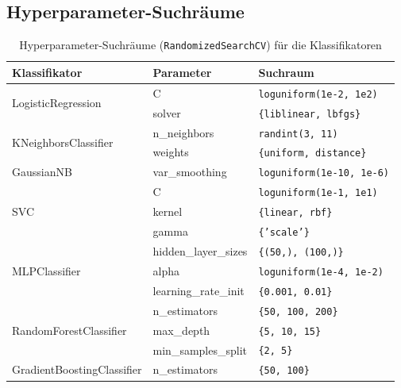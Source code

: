 \documentclass[10pt]{scrartcl}
\begin{document}
\subsection{Hyperparameter-Suchräume}
\begin{table}[htbp]
    \centering
    \caption{Hyperparameter-Suchräume (\texttt{RandomizedSearchCV}) für die Klassifikatoren}
    \label{tab:hyperparameters}
    \begin{tabular}{|l|l|l|}
        \hline
        \textbf{Klassifikator} & \textbf{Parameter} & \textbf{Suchraum} \\
        \hline
        \multirow{2}{*}{LogisticRegression}
            & C & \texttt{loguniform(1e-2, 1e2)} \\
            & solver & \texttt{\{liblinear, lbfgs\}} \\
        \hline
        \multirow{2}{*}{KNeighborsClassifier}
            & n\_neighbors & \texttt{randint(3, 11)} \\
            & weights & \texttt{\{uniform, distance\}} \\
        \hline
        GaussianNB
            & var\_smoothing & \texttt{loguniform(1e-10, 1e-6)} \\
        \hline
        \multirow{3}{*}{SVC}
            & C & \texttt{loguniform(1e-1, 1e1)} \\
            & kernel & \texttt{\{linear, rbf\}} \\
            & gamma & \texttt{\{'scale'\}} \\ %
        \hline
        \multirow{3}{*}{MLPClassifier}
            & hidden\_layer\_sizes & \texttt{\{(50,), (100,)\}} \\
            & alpha & \texttt{loguniform(1e-4, 1e-2)} \\
            & learning\_rate\_init & \texttt{\{0.001, 0.01\}} \\ %
        \hline
        \multirow{3}{*}{RandomForestClassifier}
            & n\_estimators & \texttt{\{50, 100, 200\}} \\ %
            & max\_depth & \texttt{\{5, 10, 15\}} \\ %
            & min\_samples\_split & \texttt{\{2, 5\}} \\ %
        \hline
        \multirow{3}{*}{GradientBoostingClassifier}
            & n\_estimators & \texttt{\{50, 100\}} \\

\end{tabular}
\end{table}
\end{document}
